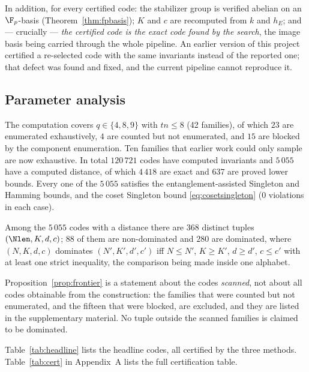 In addition, for every certified code: the stabilizer group is verified abelian
on an $\F_p$-basis (Theorem~\ref{thm:fpbasis}); $K$ and $c$ are recomputed from
$k$ and $h_E$; and --- crucially --- \emph{the certified code is the exact code
found by the search}, the image basis being carried through the whole pipeline.
An earlier version of this project certified a re-selected code with the same
invariants instead of the reported one; that defect was found and fixed, and the
current pipeline cannot reproduce it.

\subsection{Parameter analysis}

The computation covers $q\in\{4,8,9\}$ with $tn\le8$ (42 families), of which
$23$ are enumerated exhaustively, $4$ are counted but not enumerated, and $15$
are blocked by the component enumeration. Ten families that earlier work could
only sample are now exhaustive. In total $120\,721$ codes have computed
invariants and $5\,055$ have a computed distance, of which $4\,418$ are exact
and $637$ are proved lower bounds. Every one of the $5\,055$ satisfies the
entanglement-assisted Singleton and Hamming bounds, and the coset Singleton
bound \eqref{eq:cosetsingleton} (0 violations in each case).

\begin{proposition}\label{prop:frontier}
Among the $5\,055$ codes with a distance there are $368$ distinct tuples
$(\Nlen,K,d,c)$; $88$ of them are non-dominated and $280$ are dominated, where
$(N,K,d,c)$ dominates $(N',K',d',c')$ iff
$N\le N'$, $K\ge K'$, $d\ge d'$, $c\le c'$ with at least one strict
inequality, the comparison being made inside one alphabet.
\end{proposition}

\begin{remark}
Proposition~\ref{prop:frontier} is a statement about the codes \emph{scanned},
not about all codes obtainable from the construction: the families that were
counted but not enumerated, and the fifteen that were blocked, are excluded, and
they are listed in the supplementary material. No tuple outside the scanned
families is claimed to be dominated.
\end{remark}

Table~\ref{tab:headline} lists the headline codes, all certified by the three
methods. Table~\ref{tab:cert} in Appendix~A lists the full certification table.

